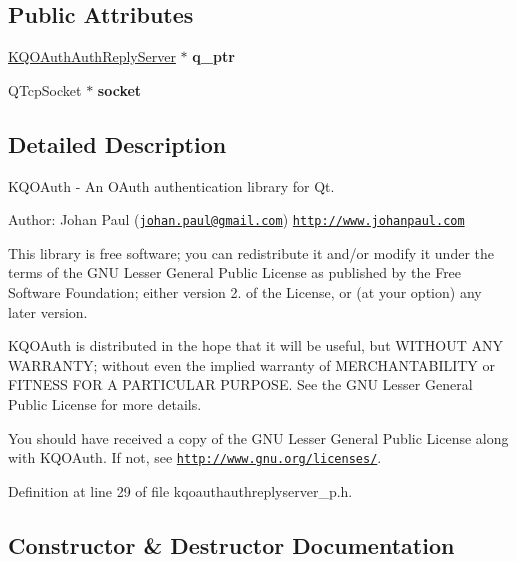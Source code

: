 \subsection*{Public Attributes}
\begin{DoxyCompactItemize}
\item 
\mbox{\label{class_k_q_o_auth_auth_reply_server_private_af751245f1ca814cd243b57f800281c66}} 
\hyperlink{class_k_q_o_auth_auth_reply_server}{K\+Q\+O\+Auth\+Auth\+Reply\+Server} $\ast$ {\bfseries q\+\_\+ptr}
\item 
\mbox{\label{class_k_q_o_auth_auth_reply_server_private_abc213146055d179098fb4ffc5848c14d}} 
Q\+Tcp\+Socket $\ast$ {\bfseries socket}
\end{DoxyCompactItemize}


\subsection{Detailed Description}
K\+Q\+O\+Auth -\/ An O\+Auth authentication library for Qt.

Author\+: Johan Paul (\href{mailto:johan.paul@gmail.com}{\tt johan.\+paul@gmail.\+com}) \href{http://www.johanpaul.com}{\tt http\+://www.\+johanpaul.\+com}

This library is free software; you can redistribute it and/or modify it under the terms of the G\+NU Lesser General Public License as published by the Free Software Foundation; either version 2. of the License, or (at your option) any later version.

K\+Q\+O\+Auth is distributed in the hope that it will be useful, but W\+I\+T\+H\+O\+UT A\+NY W\+A\+R\+R\+A\+N\+TY; without even the implied warranty of M\+E\+R\+C\+H\+A\+N\+T\+A\+B\+I\+L\+I\+TY or F\+I\+T\+N\+E\+SS F\+OR A P\+A\+R\+T\+I\+C\+U\+L\+AR P\+U\+R\+P\+O\+SE. See the G\+NU Lesser General Public License for more details.

You should have received a copy of the G\+NU Lesser General Public License along with K\+Q\+O\+Auth. If not, see \href{http://www.gnu.org/licenses/}{\tt http\+://www.\+gnu.\+org/licenses/}. 

Definition at line 29 of file kqoauthauthreplyserver\+\_\+p.\+h.



\subsection{Constructor \& Destructor Documentation}
\mbox{\label{class_k_q_o_auth_auth_reply_server_private_a638a7c5556c25e16955294f8aaa77c1b}} 
